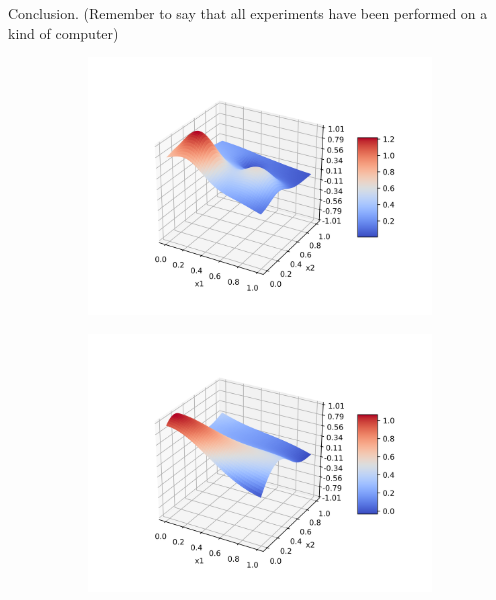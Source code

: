 \documentclass[a4paper]{article}
\numberwithin{equation}{section} %
\numberwithin{figure}{section} %
\numberwithin{table}{section} %
\theoremstyle{definition}
\begin{document}
Conclusion. (Remember to say that all experiments have been performed on
a kind of computer)

\begin{figure}[H]
	\centering
	\begin{subfigure}{.32\textwidth}
		\centering
		\includegraphics[width=1.0\linewidth]{images/franke.png}
	\end{subfigure}
	\begin{subfigure}{.32\textwidth}
		\centering
		\includegraphics[width=1.0\linewidth]{images/MLP_N_75_sigma_3_rho_1e-05.png}
	\end{subfigure}
	\begin{subfigure}{.32\textwidth}
		\centering

\end{subfigure}
\end{figure}
\end{document}
